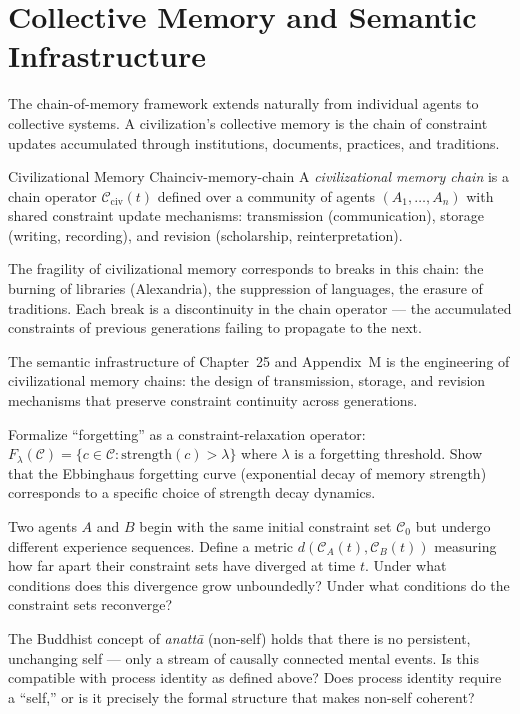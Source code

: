 \section{Collective Memory and Semantic Infrastructure}

The chain-of-memory framework extends naturally from individual agents
to collective systems. A civilization's collective memory is the chain
of constraint updates accumulated through institutions, documents,
practices, and traditions.

\begin{definition}{Civilizational Memory Chain}{civ-memory-chain}
  A \emph{civilizational memory chain} is a chain operator
  $\mathcal{C}_{\text{civ}}(t)$ defined over a community of agents
  $(A_1, \ldots, A_n)$ with shared constraint update mechanisms:
  transmission (communication), storage (writing, recording), and
  revision (scholarship, reinterpretation).
\end{definition}

The fragility of civilizational memory corresponds to breaks in this
chain: the burning of libraries (Alexandria), the suppression of
languages, the erasure of traditions. Each break is a discontinuity
in the chain operator — the accumulated constraints of previous
generations failing to propagate to the next.

The semantic infrastructure of Chapter~25 and Appendix~M is the
engineering of civilizational memory chains: the design of transmission,
storage, and revision mechanisms that preserve constraint continuity
across generations.

\begin{exercise}
  Formalize ``forgetting'' as a constraint-relaxation operator:
  $F_\lambda(\mathcal{C}) = \{c \in \mathcal{C} : \text{strength}(c) > \lambda\}$
  where $\lambda$ is a forgetting threshold. Show that the Ebbinghaus
  forgetting curve (exponential decay of memory strength) corresponds
  to a specific choice of strength decay dynamics.
\end{exercise}

\begin{exercise}
  Two agents $A$ and $B$ begin with the same initial constraint set
  $\mathcal{C}_0$ but undergo different experience sequences.
  Define a metric $d(\mathcal{C}_A(t), \mathcal{C}_B(t))$ measuring
  how far apart their constraint sets have diverged at time $t$.
  Under what conditions does this divergence grow unboundedly?
  Under what conditions do the constraint sets reconverge?
\end{exercise}

\begin{exercise}[title={Philosophical}]
  The Buddhist concept of \emph{anatt\=a} (non-self) holds that there
  is no persistent, unchanging self — only a stream of causally connected
  mental events. Is this compatible with process identity as defined
  above? Does process identity require a ``self,'' or is it precisely the
  formal structure that makes non-self coherent?
\end{exercise}
